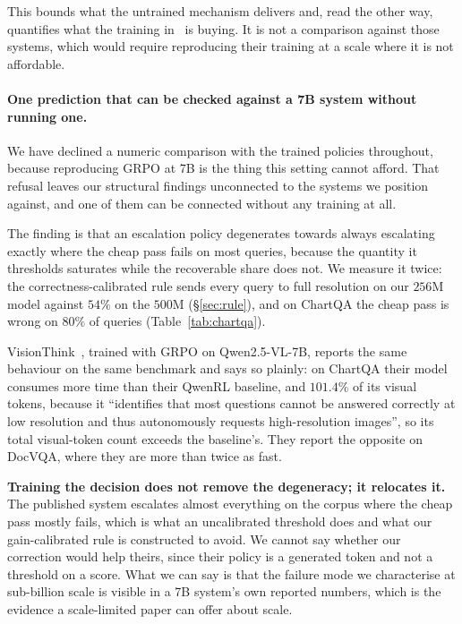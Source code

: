 \documentclass[10pt,twocolumn]{article}
\theoremstyle{plain}
\begin{document}
This bounds what the untrained mechanism delivers and, read the other way,
quantifies what the training in~\cite{visionthink,adaptvision,awares} is buying.
It is not a comparison against those systems, which would require reproducing
their training at a scale where it is not affordable.

\paragraph{One prediction that can be checked against a 7B system without
running one.} We have declined a numeric comparison with the trained policies
throughout, because reproducing GRPO at 7B is the thing this setting cannot
afford. That refusal leaves our structural findings unconnected to the systems
we position against, and one of them can be connected without any training at
all.

The finding is that an escalation policy degenerates towards always escalating
exactly where the cheap pass fails on most queries, because the quantity it
thresholds saturates while the recoverable share does not. We measure it twice:
the correctness-calibrated rule sends every query to full resolution on our
$256$M model against $54\%$ on the $500$M
(\S\ref{sec:rule}), and on ChartQA the cheap pass is wrong on $80\%$ of queries
(Table~\ref{tab:chartqa}).

VisionThink~\cite{visionthink}, trained with GRPO on Qwen2.5-VL-7B, reports the
same behaviour on the same benchmark and says so plainly: on ChartQA their
model consumes more time than their QwenRL baseline, and $101.4\%$ of its
visual tokens, because it ``identifies that most questions cannot be answered
correctly at low resolution and thus autonomously requests high-resolution
images'', so its total visual-token count exceeds the baseline's. They report
the opposite on DocVQA, where they are more than twice as fast.

\textbf{Training the decision does not remove the degeneracy; it relocates
it.} The published system escalates almost everything on the corpus where the
cheap pass mostly fails, which is what an uncalibrated threshold does and what
our gain-calibrated rule is constructed to avoid. We cannot say whether our
correction would help theirs, since their policy is a generated token and not a
threshold on a score. What we can say is that the failure mode we characterise
at sub-billion scale is visible in a 7B system's own reported numbers, which is
the evidence a scale-limited paper can offer about scale.
\end{document}
